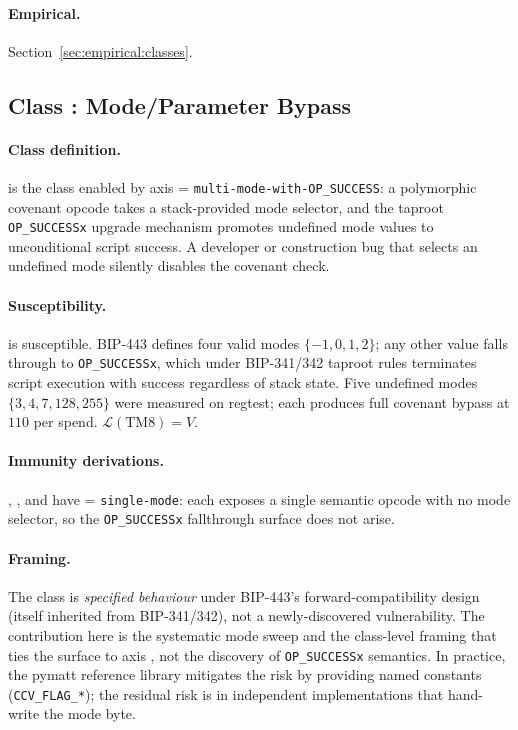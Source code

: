 \paragraph{Empirical.} Section~\ref{sec:empirical:classes}.

\subsection{Class \classmode{}: Mode/Parameter Bypass}
\label{sec:imposs:class_mode}

\paragraph{Class definition.} \classmode{} is the class enabled by
axis \axopsurf{} = \texttt{multi-mode-with-OP\_SUCCESS}: a
polymorphic covenant opcode takes a stack-provided mode selector,
and the taproot \texttt{OP\_SUCCESSx} upgrade mechanism promotes
undefined mode values to unconditional script success. A developer
or construction bug that selects an undefined mode silently disables
the covenant check.

\paragraph{Susceptibility.} \opccv{} is susceptible. BIP-443 defines
four valid modes $\{-1, 0, 1, 2\}$; any other value falls through to
\texttt{OP\_SUCCESSx}, which under BIP-341/342 taproot rules
terminates script execution with success regardless of stack state.
Five undefined modes $\{3, 4, 7, 128, 255\}$ were measured on
regtest; each produces full covenant bypass at $110$\vB{} per spend.
$\mathcal{L}(\mathrm{TM8}) = V$.

\paragraph{Immunity derivations.} \opctv{}, \opvault{}, and \catcsfs{}
have \axopsurf{} = \texttt{single-mode}: each exposes a single
semantic opcode with no mode selector, so the \texttt{OP\_SUCCESSx}
fallthrough surface does not arise.

\paragraph{Framing.} The class is \emph{specified behaviour} under
BIP-443's forward-compatibility design (itself inherited from
BIP-341/342), not a newly-discovered vulnerability. The contribution
here is the systematic mode sweep and the class-level framing that
ties the surface to axis \axopsurf{}, not the discovery of
\texttt{OP\_SUCCESSx} semantics. In practice, the pymatt reference
library mitigates the risk by providing named constants
(\texttt{CCV\_FLAG\_*}); the residual risk is in independent
implementations that hand-write the mode byte.

